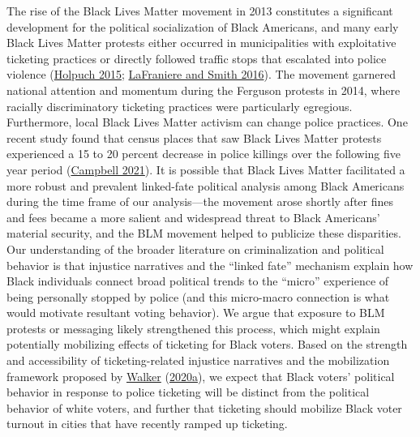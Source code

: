 \documentclass[
  12pt,
]{article}
\begin{document}
The rise of the Black Lives Matter movement in 2013 constitutes a significant development for the political socialization of Black Americans, and many early Black Lives Matter protests either occurred in municipalities with exploitative ticketing practices or directly followed traffic stops that escalated into police violence (\protect\hyperlink{ref-Holpuch2015}{Holpuch 2015}; \protect\hyperlink{ref-LaFraniere2016}{LaFraniere and Smith 2016}). The movement garnered national attention and momentum during the Ferguson protests in 2014, where racially discriminatory ticketing practices were particularly egregious. Furthermore, local Black Lives Matter activism can change police practices. One recent study found that census places that saw Black Lives Matter protests experienced a 15 to 20 percent decrease in police killings over the following five year period (\protect\hyperlink{ref-Campbell2021}{Campbell 2021}). It is possible that Black Lives Matter facilitated a more robust and prevalent linked-fate political analysis among Black Americans during the time frame of our analysis---the movement arose shortly after fines and fees became a more salient and widespread threat to Black Americans' material security, and the BLM movement helped to publicize these disparities. Our understanding of the broader literature on criminalization and political behavior is that injustice narratives and the ``linked fate'' mechanism explain how Black individuals connect broad political trends to the ``micro'' experience of being personally stopped by police (and this micro-macro connection is what would motivate resultant voting behavior). We argue that exposure to BLM protests or messaging likely strengthened this process, which might explain potentially mobilizing effects of ticketing for Black voters. Based on the strength and accessibility of ticketing-related injustice narratives and the mobilization framework proposed by \protect\hyperlink{ref-Walker2020a}{Walker} (\protect\hyperlink{ref-Walker2020a}{2020a}), we expect that Black voters' political behavior in response to police ticketing will be distinct from the political behavior of white voters, and further that ticketing should mobilize Black voter turnout in cities that have recently ramped up ticketing.
\end{document}
